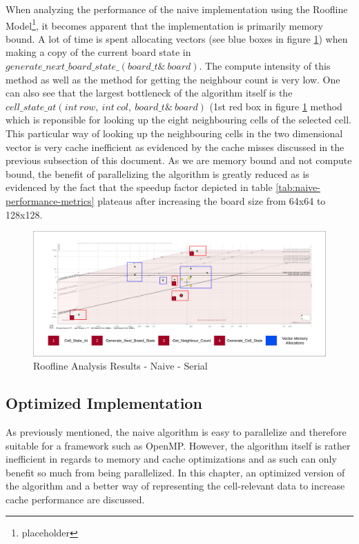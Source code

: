 \documentclass[a4paper,english,12pt,twoside=false]{scrartcl} %
\begin{document}
When analyzing the performance of the naive implementation using the Roofline Model\footnote{placeholder}, it becomes apparent that the implementation is primarily memory bound. A lot of time is spent allocating vectors (see blue boxes in figure \ref{fig:roofline-naive-32-100k}) when making a copy of the current board state in $generate{\_}next{\_}board{\_}state{\_}(board{\_}t{\&}{\ }board)$. The compute intensity of this method as well as the method for getting the neighbour count is very low. One can also see that the largest bottleneck of the algorithm itself is the $cell{\_}state{\_}at(int{\ }row,{\ }int{\ }col,{\ }board{\_}t{\&}{\ } board)$ (1st red box in figure \ref{fig:roofline-naive-32-100k} method which is reponsible for looking up the eight neighbouring cells of the selected cell. This particular way of looking up the neighbouring cells in the two dimensional vector is very cache inefficient as evidenced by the cache misses discussed in the previous subsection of this document. As we are memory bound and not compute bound, the benefit of parallelizing the algorithm is greatly reduced as is evidenced by the fact that the speedup factor depicted in table \ref{tab:naive-performance-metrics} plateaus after increasing the board size from 64x64 to 128x128. 

\begin{figure}[tbh!]
	\centering
	\includegraphics[width=16cm]{imgs/roofline-naive-32-100k.png}
	\caption{Roofline Analysis Results - Naive - Serial}
	\label{fig:roofline-naive-32-100k}
\end{figure}

\subsection{Optimized Implementation}

As previously mentioned, the naive algorithm is easy to parallelize and therefore suitable for a framework such as OpenMP. However, the algorithm itself is rather inefficient in regards to memory and cache optimizations and as such can only benefit so much from being parallelized. In this chapter, an optimized version of the algorithm and a better way of representing the cell-relevant data to increase cache performance are discussed.
\end{document}
